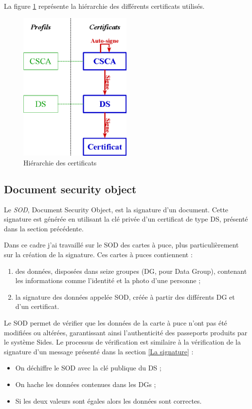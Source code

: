 La figure \ref{hierarchie_CSCA_DS} représente la hiérarchie des différents certificats utilisés.
\begin{figure}[!h]
	\center
	\includegraphics[width=0.5\textwidth]{img/hierarchie_CSCA_DS.png}
	\caption{Hiérarchie des certificats}
	\label{hierarchie_CSCA_DS}
\end{figure}


\subsection{Document security object}

Le \textit{SOD}, Document Security Object, est la signature d'un document.
Cette signature est générée en utilisant la clé privée d'un certificat de type DS, présenté dans la section précédente.

Dans ce cadre j'ai travaillé sur le SOD des cartes à puce, plus particulièrement sur la création de la signature.
Ces cartes à puces contiennent :
\begin{enumerate}
	\item des données, disposées dans seize groupes (DG, pour Data Group), contenant les informations comme l'identité et la photo d'une personne ;
	\item la signature des données appelée SOD, créée à partir des différents DG et d'un certificat.
\end{enumerate}

Le SOD permet de vérifier que les données de la carte à puce n'ont pas été modifiées ou altérées, garantissant ainsi l'authenticité des passeports produits par le système Sides.
Le processus de vérification est similaire à la vérification de la signature d'un message présenté dans la section \ref{La signature} :
\begin{itemize}
	\item On déchiffre le SOD avec la clé publique du DS ;
	\item On hache les données contenues dans les DGs ;
	\item Si les deux valeurs sont égales alors les données sont correctes.
\end{itemize}

